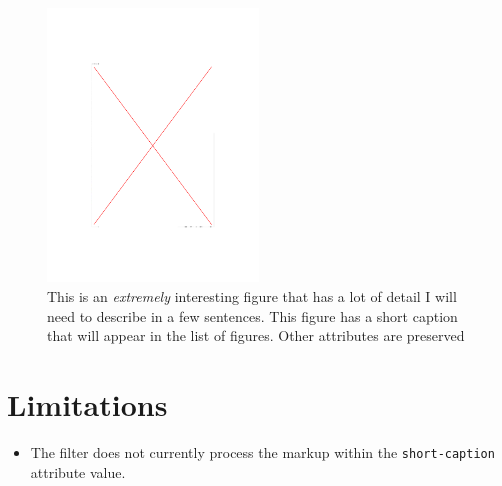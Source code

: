 \hypertarget{fig:shortcap}{%
\begin{figure}
\centering
\includegraphics[width=0.5\textwidth,height=\textheight]{fig.pdf}
\caption[An interesting figure]{This is an \emph{extremely} interesting
figure that has a lot of detail I will need to describe in a few
sentences. This figure has a short caption that will appear in the list
of figures. Other attributes are preserved}
\label{fig:shortcap}
\end{figure}
}

\hypertarget{limitations}{%
\section{Limitations}\label{limitations}}

\begin{itemize}
\tightlist
\item
  The filter does not currently process the markup within the
  \texttt{short-caption} attribute value.
\end{itemize}
